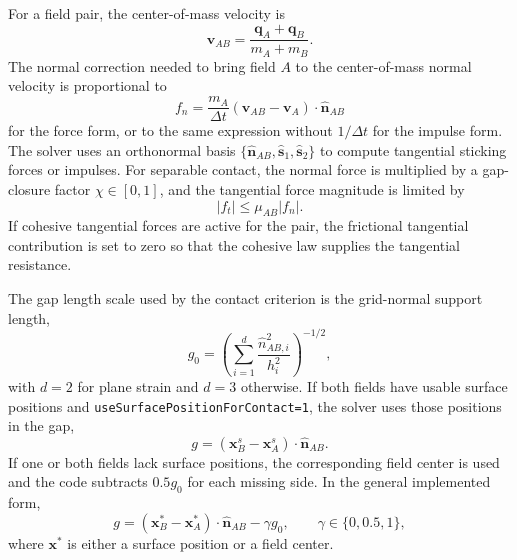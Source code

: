 For a field pair, the center-of-mass velocity is
\begin{equation}
  \mathbf{v}_{AB}=\frac{\mathbf{q}_A+\mathbf{q}_B}{m_A+m_B}.
\end{equation}
The normal correction needed to bring field $A$ to the center-of-mass normal velocity is proportional to
\begin{equation}
  f_n=\frac{m_A}{\Delta t}\left(\mathbf{v}_{AB}-\mathbf{v}_A\right)\cdot\hat{\mathbf{n}}_{AB}
  \label{eq:contact-normal-force-core}
\end{equation}
for the force form, or to the same expression without $1/\Delta t$ for the impulse form.  The solver uses an orthonormal basis $\{\hat{\mathbf{n}}_{AB},\hat{\mathbf{s}}_1,\hat{\mathbf{s}}_2\}$ to compute tangential sticking forces or impulses.  For separable contact, the normal force is multiplied by a gap-closure factor $\chi\in[0,1]$, and the tangential force magnitude is limited by
\begin{equation}
  |f_t|\le \mu_{AB}|f_n|.
\end{equation}
If cohesive tangential forces are active for the pair, the frictional tangential contribution is set to zero so that the cohesive law supplies the tangential resistance.

The gap length scale used by the contact criterion is the grid-normal support length,
\begin{equation}
  g_0 = \left(\sum_{i=1}^{d}\frac{\hat n_{AB,i}^{2}}{h_i^2}\right)^{-1/2},
  \label{eq:contact-gap0}
\end{equation}
with $d=2$ for plane strain and $d=3$ otherwise.  If both fields have usable surface positions and \texttt{useSurfacePositionForContact=1}, the solver uses those positions in the gap,
\begin{equation}
  g=(\mathbf{x}^{s}_B-\mathbf{x}^{s}_A)\cdot\hat{\mathbf{n}}_{AB}.
\end{equation}
If one or both fields lack surface positions, the corresponding field center is used and the code subtracts $0.5g_0$ for each missing side.  In the general implemented form,
\begin{equation}
  g=(\mathbf{x}^{*}_B-\mathbf{x}^{*}_A)\cdot\hat{\mathbf{n}}_{AB}-\gamma g_0,
  \qquad \gamma\in\{0,0.5,1\},
  \label{eq:contact-gap-general}
\end{equation}
where $\mathbf{x}^{*}$ is either a surface position or a field center.


